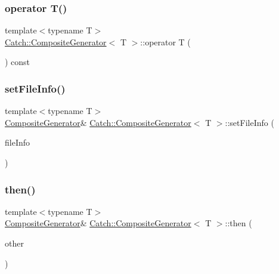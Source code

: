\subsubsection{\texorpdfstring{operator T()}{operator T()}}
{\footnotesize\ttfamily template$<$typename T$>$ \\
\mbox{\hyperlink{class_catch_1_1_composite_generator}{Catch\+::\+Composite\+Generator}}$<$ T $>$\+::operator T (\begin{DoxyParamCaption}{ }\end{DoxyParamCaption}) const\hspace{0.3cm}{\ttfamily [inline]}}

\mbox{\label{class_catch_1_1_composite_generator_ac3c57cf4ca5472f440bf71e2936bcd4a}} 
\subsubsection{\texorpdfstring{set\+File\+Info()}{setFileInfo()}}
{\footnotesize\ttfamily template$<$typename T$>$ \\
\mbox{\hyperlink{class_catch_1_1_composite_generator}{Composite\+Generator}}\& \mbox{\hyperlink{class_catch_1_1_composite_generator}{Catch\+::\+Composite\+Generator}}$<$ T $>$\+::set\+File\+Info (\begin{DoxyParamCaption}\item[{const char $\ast$}]{file\+Info }\end{DoxyParamCaption})\hspace{0.3cm}{\ttfamily [inline]}}

\mbox{\label{class_catch_1_1_composite_generator_a2e03f42df85cdd238aabd77a80b075d5}} 
\subsubsection{\texorpdfstring{then()}{then()}\hspace{0.1cm}{\footnotesize\ttfamily [1/2]}}
{\footnotesize\ttfamily template$<$typename T$>$ \\
\mbox{\hyperlink{class_catch_1_1_composite_generator}{Composite\+Generator}}\& \mbox{\hyperlink{class_catch_1_1_composite_generator}{Catch\+::\+Composite\+Generator}}$<$ T $>$\+::then (\begin{DoxyParamCaption}\item[{\mbox{\hyperlink{class_catch_1_1_composite_generator}{Composite\+Generator}}$<$ T $>$ \&}]{other }\end{DoxyParamCaption})\hspace{0.3cm}{\ttfamily [inline]}}

